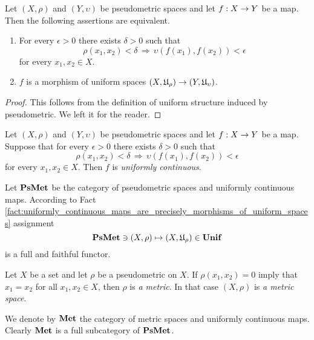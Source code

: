 \begin{fact}\label{fact:uniformly_continuous_maps_are_precisely_morphisms_of_uniform_spaces}
Let $(X,\rho)$ and $(Y,\upsilon)$ be pseudometric spaces and let $f:X\rightarrow Y$ be a map. Then the following assertions are equivalent.
\begin{enumerate}[label=\emph{\textbf{(\roman*)}}, leftmargin=*]
\item For every $\epsilon > 0$ there exists $\delta > 0$ such that
$$\rho(x_1,x_2) < \delta\,\Rightarrow\,\upsilon\left(f(x_1),f(x_2)\right) < \epsilon$$
for every $x_1,x_2 \in X$.
\item $f$ is a morphism of uniform spaces $\left(X,{\mathfrak U}_{\rho}\right) \rightarrow \left(Y,{\mathfrak U}_{\upsilon}\right)$.
\end{enumerate}
\end{fact}
\begin{proof}
This follows from the definition of uniform structure induced by pseudometric. We left it for the reader.
\end{proof}

\begin{definition}
Let $(X,\rho)$ and $(Y,\upsilon)$ be pseudometric spaces and let $f:X\rightarrow Y$ be a map. Suppose that for every $\epsilon > 0$ there exists $\delta > 0$ such that
$$\rho(x_1,x_2) < \delta\,\Rightarrow\,\upsilon\left(f(x_1),f(x_2)\right) < \epsilon$$
for every $x_1,x_2 \in X$. Then $f$ is \textit{uniformly continuous}.
\end{definition}

\begin{remark}\label{remark:functor_of_uniform_structure_induced_by_pseudometric}
Let $\mathbf{PsMet}$ be the category of pseudometric spaces and uniformly continuous maps. According to Fact \ref{fact:uniformly_continuous_maps_are_precisely_morphisms_of_uniform_spaces} assignment 
$$\mathbf{PsMet} \ni \left(X,\rho\right) \mapsto \left(X,{\mathfrak U}_{\rho}\right) \in \mathbf{Unif}$$
is a full and faithful functor.
\end{remark}

\begin{definition}
Let $X$ be a set and let $\rho$ be a pseudometric on $X$. If $\rho(x_1,x_2) = 0$ imply that $x_1 = x_2$ for all $x_1,x_2\in X$, then $\rho$ is \textit{a metric}. In that case $\left(X,\rho\right)$ is \textit{a metric space}.
\end{definition}

\begin{remark}\label{remark:the_category_of_metric_spaces}
We denote by $\mathbf{Met}$ the category of metric spaces and uniformly continuous maps. Clearly $\mathbf{Met}$ is a full subcategory of $\mathbf{PsMet}$.
\end{remark}

